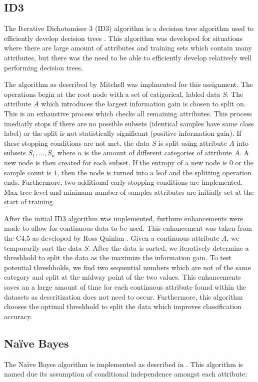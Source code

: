 \documentclass[11pt]{article}
\begin{document}
\subsection{ID3}
The Iterative Dichotomiser 3 (ID3) algorithm is a decision tree algorithm used to efficiently develop decision trees \cite{Quinlan:1986:IDT:637962.637969}. This algorithm was developed for situations where there are large amount of attributes and training sets which contain many attributes, but there was the need to be able to efficiently develop relatively well performing decision trees.

The algorithm as described by Mitchell \cite{Mitchell:1997:ML:541177} was implmented for this assignment. The operations begin at the root node with a set of catigorical, labled data $S$. The attribute $A$ which introduces the largest information gain is chosen to split on. This is an exhaustive process which checks all remaining attributes. This process imediatly stops if there are no possible subsets (identical samples have same class label) or the split is not statistically significant (positive information gain). If these stopping conditions are not met, the data $S$ is split using attribute $A$ into subsets ${S_1,...,S_n}$ where $n$ is the amount of different categories of attribute $A$. A new node is then created for each subset. If the entropy of a new node is $0$ or the sample count is $1$, then the node is turned into a leaf and the splitting operation ends. Furthermore, two additional early stopping conditions are implemented. Max tree level and minimum number of samples attributes are initially set at the start of training.

After the initial ID3 algorithm was implemented, furthure enhancements were made to allow for continuous data to be used. This enhancement was taken from the C4.5  as developed by Ross Quinlan \citep{c45algorithm}. Given a continuous attribute $A$, we temporarily sort the data $S$. After the data is sorted, we iteratively determine a threshhold to split the data as the maximize the information gain. To test potential threshholds, we find two sequential numbers which are not of the same category and split at the midway point of the two values. This enhancements saves an a large amount of time for each continuous attribute found within the datasets as descritization does not need to occur. Furthermore, this algorithm chooses the optimal threshhold to split the data which improves classification accuracy.

\subsection{Naïve Bayes}
The Naïve Bayes algorithm is implemented as described in \cite{Mitchell:1997:ML:541177}. This algorithm is named due its assumption of conditional independence amongst each attribute:
\end{document}
